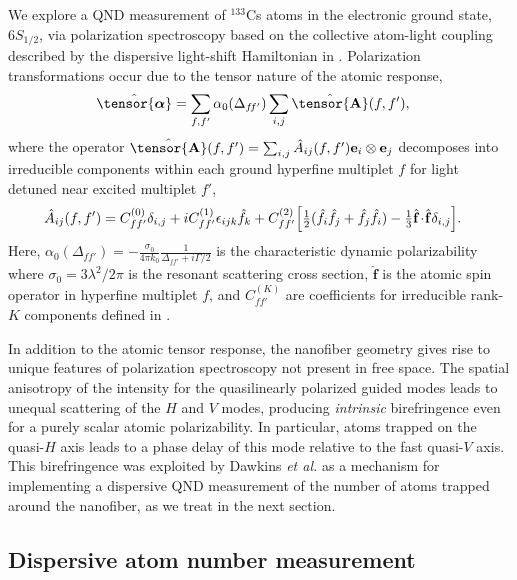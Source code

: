 \documentclass[preprint, aps,pra,onecolumn]{revtex4-1} %
\newcommand{\poltens}{\hat{\tensor{\boldsymbol{\alpha}}}}
\newcommand{\charpol}{\alpha_0(\Delta_{f\!f'})}
\begin{document}
We explore a QND measurement of ${}^{133}$Cs atoms in the electronic ground state, $6S_{1/2}$, via polarization spectroscopy based on the collective atom-light coupling described by the dispersive light-shift Hamiltonian in . Polarization transformations occur due to the tensor nature of the atomic response,
	\begin{align} \label{Eq::Polarizability}
		\poltens &=  \sum_{f,f'} \charpol \sum_{i,j} \hat{\tensor{\mbf{A}}}(f,f'),
	\end{align}
where the operator $\hat{\tensor{\mbf{A}}}(f,f') = \sum_{i,j} \hat{A}_{ij}(f,f')\mathbf{e}_i \otimes \mathbf{e}_j$ decomposes into irreducible components within each ground hyperfine multiplet $f$ for light detuned near excited multiplet $f'$,  
	\begin{align} \label{Eq::PolarizabilityIrrep}
		\hat{A}_{ij}(f,f')&=  C_{ff'}^{(0)} \delta_{i,j}+ iC_{ff'}^{(1)}\epsilon_{ijk}\hat{f}_k+ C_{ff'}^{(2)} \Big[ \mbox{$\frac{1}{2}$} ( \hat{f}_i\hat{f}_j +\hat{f}_j\hat{f}_i )-\mbox{$\frac{1}{3}$} \hat{\mathbf{f}}\!\cdot\!\hat{\mathbf{f}} \delta_{i,j} \Big]. 
\end{align}
Here, $\charpol = -\frac{\sigma_0}{4\pi k_0}\frac{1 }{\Delta_{ff'}+i\Gamma/2}$ is the characteristic dynamic polarizability where $\sigma_0 = 3 \lambda^2/2\pi$ is the resonant scattering cross section, $\hat{\mathbf{f}}$ is the atomic  spin operator in hyperfine multiplet $f$, and $C_{ff'}^{(K)}$ are coefficients for irreducible rank-$K$ components defined in \cite{deutsch_quantum_2010}. 

In addition to the atomic tensor response, the nanofiber geometry gives rise to unique features of polarization spectroscopy not present in free space.  The spatial anisotropy of the intensity for the quasilinearly polarized guided modes leads to unequal scattering of the $H$ and $V$ modes, producing \emph{intrinsic} birefringence even for a purely scalar atomic polarizability.  
In particular, atoms trapped on the quasi-$H$ axis leads to a phase delay of this mode relative to the fast quasi-$V$ axis. 
This birefringence was exploited by Dawkins {\em et al.} \cite{dawkins_dispersive_2011} as a mechanism for implementing a dispersive QND measurement of the number of atoms trapped around the nanofiber, as we treat in the next section. 


	\subsection{Dispersive atom number measurement} \label{Sec::AtomNumberMeasurement}
\end{document}
